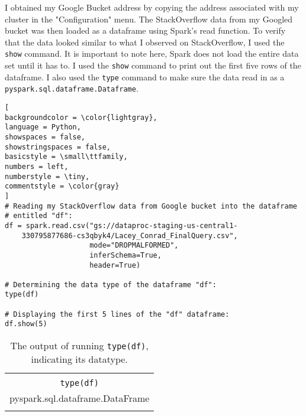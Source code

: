 \documentclass[]{article}
\newcommand{\code}[1]{\colorbox{light-gray}{\texttt{#1}}}
\begin{document}
I obtained my Google Bucket address by copying the address associated with my cluster in the "Configuration" menu.  The StackOverflow data from my Googled bucket was then loaded as a dataframe using Spark's read function.  To verify that the data looked similar to what I observed on StackOverflow, I used the \code{show} command.  It is important to note here, Spark does not load the entire data set until it has to.  I used the \code{show} command to print out the first five rows of the dataframe.  I also used the \code{type} command to make sure the data read in as a \code{pyspark.sql.dataframe.Dataframe}. 

\begin{lstlisting}[
backgroundcolor = \color{lightgray},
language = Python,
showspaces = false,
showstringspaces = false,
basicstyle = \small\ttfamily,
numbers = left,
numberstyle = \tiny,
commentstyle = \color{gray}
]
# Reading my StackOverflow data from Google bucket into the dataframe
# entitled "df":
df = spark.read.csv("gs://dataproc-staging-us-central1-
	330795877686-cs3qbyk4/Lacey_Conrad_FinalQuery.csv",
					mode="DROPMALFORMED",
					inferSchema=True,
					header=True)

# Determining the data type of the dataframe "df":
type(df)

# Displaying the first 5 lines of the "df" dataframe:
df.show(5)
\end{lstlisting}


\begin{table}[!ht]
	\begin{center}
		\caption{The output of running \code{type(df)}, indicating its datatype.}
		\label{tab:table1}
		\begin{tabular}{|c|} 
			\hline
			\\
			\code{type(df)}\\
			\hline
			pyspark.sql.dataframe.DataFrame\\
			\\
			\hline
		\end{tabular}
	\end{center}
\end{table}
\end{document}
